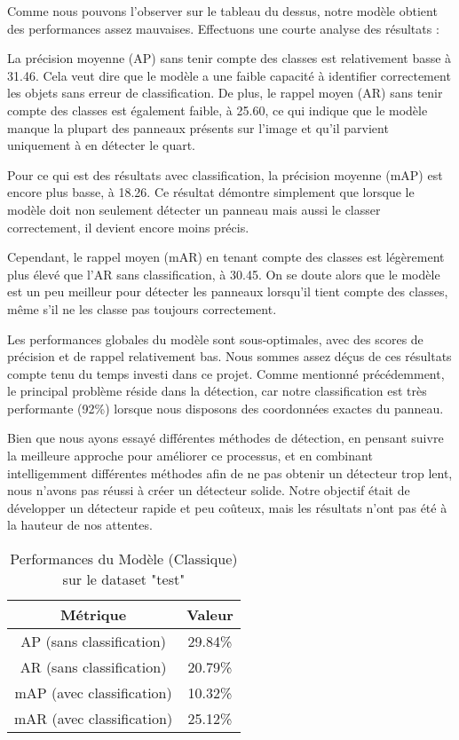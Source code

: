 \documentclass[twocolumn,10pt]{article}
\begin{document}
    \vspace{1cm}


    Comme nous pouvons l'observer sur le tableau du dessus, notre modèle obtient des performances assez mauvaises. Effectuons une courte analyse des résultats :

    La précision moyenne (AP) sans tenir compte des classes est relativement basse à  31.46. Cela veut dire que le modèle a une faible capacité à identifier correctement les objets sans erreur de classification. De plus, le rappel moyen (AR) sans tenir compte des classes est également faible, à 25.60, ce qui indique que le modèle manque la plupart des panneaux présents sur l'image et qu'il parvient uniquement à en détecter le quart.

    Pour ce qui est des résultats avec classification, la précision moyenne (mAP) est encore plus basse, à 18.26. Ce résultat démontre simplement que lorsque le modèle doit non seulement détecter un panneau mais aussi le classer correctement, il devient encore moins précis.

    Cependant, le rappel moyen (mAR) en tenant compte des classes est légèrement plus élevé que l'AR sans classification, à 30.45. On se doute alors que le modèle est un peu meilleur pour détecter les panneaux lorsqu'il tient compte des classes, même s'il ne les classe pas toujours correctement.

    Les performances globales du modèle sont sous-optimales, avec des scores de précision et de rappel relativement bas. Nous sommes assez déçus de ces résultats compte tenu du temps investi dans ce projet. Comme mentionné précédemment, le principal problème réside dans la détection, car notre classification est très performante (92\%) lorsque nous disposons des coordonnées exactes du panneau.

    Bien que nous ayons essayé différentes méthodes de détection, en pensant suivre la meilleure approche pour améliorer ce processus, et en combinant intelligemment différentes méthodes afin de ne pas obtenir un détecteur trop lent, nous n'avons pas réussi à créer un détecteur solide. Notre objectif était de développer un détecteur rapide et peu coûteux, mais les résultats n'ont pas été à la hauteur de nos attentes.

    \begin{table}[h!]
        \centering
        \begin{tabular}{|c|c|}
            \hline
            \textbf{Métrique} & \textbf{Valeur} \\ \hline
            AP (sans classification) & 29.84\%	 \\ \hline
            AR (sans classification) & 20.79\% \\ \hline
            mAP (avec classification) & 10.32\% \\ \hline
            mAR (avec classification) & 25.12\%	 \\ \hline
        \end{tabular}
        \caption{Performances du Modèle (Classique) sur le dataset "test"}
        \label{tab:performances2}
    \end{table}
\end{document}
